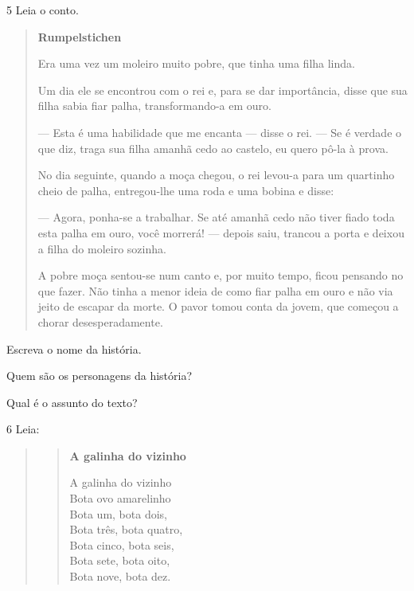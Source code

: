 \num{5} Leia o conto.


\begin{quote}
\textbf{Rumpelstichen}

Era uma vez um moleiro muito pobre, que tinha uma filha linda.

Um dia ele se encontrou com o rei e, para se dar importância,
disse que sua filha sabia fiar palha, transformando-a em ouro.

--- Esta é uma habilidade que me encanta --- disse o
rei. --- Se é verdade o que diz, traga sua filha amanhã cedo ao
castelo, eu quero pô-la à prova.

No dia seguinte, quando a moça chegou, o rei levou-a
para um quartinho cheio de palha, entregou-lhe uma roda e uma
bobina e disse:

--- Agora, ponha-se a trabalhar. Se até amanhã cedo
não tiver fiado toda esta palha em ouro, você morrerá! ---
depois saiu, trancou a porta e deixou a filha do moleiro
sozinha.

A pobre moça sentou-se num canto e, por muito tempo,
ficou pensando no que fazer. Não tinha a menor ideia de como
fiar palha em ouro e não via jeito de escapar da morte. O
pavor tomou conta da jovem, que começou a chorar
desesperadamente.

\end{quote}

\begin{escolha}
\item Escreva o nome da história.


\item Quem são os personagens da história?


\item Qual é o assunto do texto?

\end{escolha}

\num{6} Leia:

\begin{quote}
\begin{verse}
\textbf{A galinha do vizinho}

A galinha do vizinho\\
Bota ovo amarelinho\\
Bota um, bota dois,\\
Bota três, bota quatro,\\
Bota cinco, bota seis,\\
Bota sete, bota oito,\\
Bota nove, bota dez.
\end{verse}
\end{quote}

